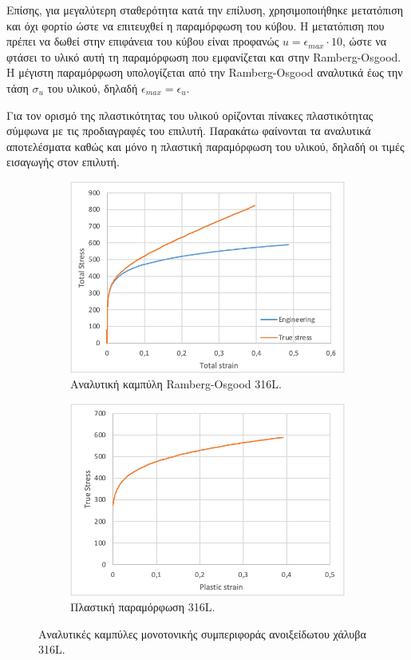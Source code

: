 \documentclass{article}
\begin{document}
Επίσης, για μεγαλύτερη σταθερότητα κατά την επίλυση, χρησιμοποιήθηκε μετατόπιση και όχι φορτίο ώστε να επιτευχθεί η παραμόρφωση του κύβου. Η μετατόπιση που πρέπει να δωθεί στην επιφάνεια του κύβου είναι προφανώς $u = \epsilon_{max} \cdot 10$, ώστε να φτάσει το υλικό αυτή τη παραμόρφωση που εμφανίζεται και στην Ramberg-Osgood. Η μέγιστη παραμόρφωση  υπολογίζεται από την Ramberg-Osgood αναλυτικά έως την τάση $\sigma_u$ του υλικού, δηλαδή $\epsilon_{max} = \epsilon_u$. 
\par Για τον ορισμό της πλαστικότητας του υλικού ορίζονται πίνακες πλαστικότητας σύμφωνα με τις προδιαγραφές του επιλυτή. Παρακάτω φαίνονται τα αναλυτικά αποτελέσματα καθώς και μόνο η πλαστική παραμόρφωση του υλικού, δηλαδή οι τιμές εισαγωγής στον επιλυτή.
\begin{figure}[H]
    \centering
    \begin{subfigure}{0.45\linewidth}
        \centering
        \includegraphics[width=\linewidth]{media/ragood.png}
        \caption{Αναλυτική καμπύλη Ramberg-Osgood 316L.}
    \end{subfigure}
    \hfill
    \begin{subfigure}{0.45\linewidth}
        \centering
        \includegraphics[width=\linewidth]{media/plabaqus.png}
        \caption{Πλαστική παραμόρφωση 316L.}
    \end{subfigure}
    \caption{Αναλυτικές καμπύλες μονοτονικής συμπεριφοράς ανοιξείδωτου χάλυβα 316L.}
    \label{fig:anal}
\end{figure}
\end{document}
